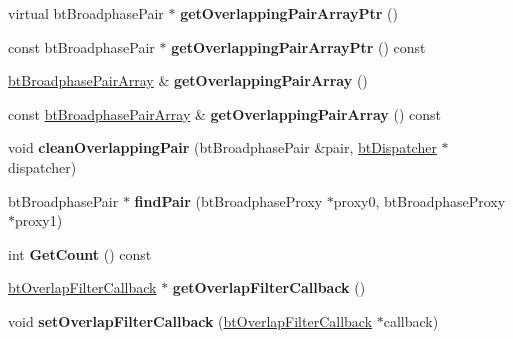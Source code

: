 \begin{DoxyCompactItemize}
virtual bt\+Broadphase\+Pair $\ast$ {\bfseries get\+Overlapping\+Pair\+Array\+Ptr} ()
\item 
\mbox{\label{classbtHashedOverlappingPairCache_a464066121648950c9545db98b20f78d4}} 
const bt\+Broadphase\+Pair $\ast$ {\bfseries get\+Overlapping\+Pair\+Array\+Ptr} () const
\item 
\mbox{\label{classbtHashedOverlappingPairCache_aaca68aaa41dacb5791fe90f7fc284e7c}} 
\hyperlink{classbtAlignedObjectArray}{bt\+Broadphase\+Pair\+Array} \& {\bfseries get\+Overlapping\+Pair\+Array} ()
\item 
\mbox{\label{classbtHashedOverlappingPairCache_ab36d65daeb34a0ab0e60504523841d2e}} 
const \hyperlink{classbtAlignedObjectArray}{bt\+Broadphase\+Pair\+Array} \& {\bfseries get\+Overlapping\+Pair\+Array} () const
\item 
\mbox{\label{classbtHashedOverlappingPairCache_a114297f90c75db7d8ab95b3a24084b6f}} 
void {\bfseries clean\+Overlapping\+Pair} (bt\+Broadphase\+Pair \&pair, \hyperlink{classbtDispatcher}{bt\+Dispatcher} $\ast$dispatcher)
\item 
\mbox{\label{classbtHashedOverlappingPairCache_a386a5334130b85783393fc7c8fd05ffb}} 
bt\+Broadphase\+Pair $\ast$ {\bfseries find\+Pair} (bt\+Broadphase\+Proxy $\ast$proxy0, bt\+Broadphase\+Proxy $\ast$proxy1)
\item 
\mbox{\label{classbtHashedOverlappingPairCache_aa3de79b309d27109e54749090a88336d}} 
int {\bfseries Get\+Count} () const
\item 
\mbox{\label{classbtHashedOverlappingPairCache_a423c20dadb90c50a5a889e4a649e35ff}} 
\hyperlink{structbtOverlapFilterCallback}{bt\+Overlap\+Filter\+Callback} $\ast$ {\bfseries get\+Overlap\+Filter\+Callback} ()
\item 
\mbox{\label{classbtHashedOverlappingPairCache_a9af1a20fd2d8c1d28423114760a72aa1}} 
void {\bfseries set\+Overlap\+Filter\+Callback} (\hyperlink{structbtOverlapFilterCallback}{bt\+Overlap\+Filter\+Callback} $\ast$callback)

\end{DoxyCompactItemize}

